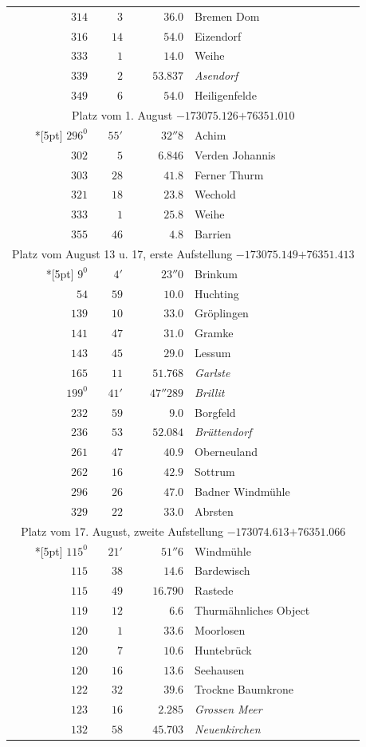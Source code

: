\begin{longtable}{@{}rrrp{.61\linewidth}@{}}
\(314\)&\(3\)&\(36.0\)&\raggedright Bremen Dom\tabularnewline
\(316\)&\(14\)&\(54.0\)&\raggedright Eizendorf\tabularnewline
\(333\)&\(1\)&\(14.0\)&\raggedright Weihe\tabularnewline
\(339\)&\(2\)&\(53.837\)&\raggedright \textit{Asendorf}\tabularnewline
\(349\)&\(6\)&\(54.0\)&\raggedright Heiligenfelde\tabularnewline
\multicolumn{4}{c}{Platz vom 1. August \(-173075.126\)\qquad\(+76351.010\)}\\*[5pt]
\(296^{0}\)&\(55'\)&\(32''8\)&\raggedright Achim\tabularnewline
\(302\)&\(5\)&\(6.846\)&\raggedright Verden Johannis\tabularnewline
\(303\)&\(28\)&\(41.8\)&\raggedright Ferner Thurm\tabularnewline
\(321\)&\(18\)&\(23.8\)&\raggedright Wechold\tabularnewline
\(333\)&\(1\)&\(25.8\)&\raggedright Weihe\tabularnewline
\(355\)&\(46\)&\(4.8\)&\raggedright Barrien\tabularnewline
\multicolumn{4}{c}{Platz vom August 13 u. 17, erste Aufstellung \(-173075.149\)\qquad\(+76351.413\)}\\*[5pt]
\(9^{0}\)&\(4'\)&\(23''0\)&\raggedright Brinkum\tabularnewline
\(54\)&\(59\)&\(10.0\)&\raggedright Huchting\tabularnewline
\(139\)&\(10\)&\(33.0\)&\raggedright Gröplingen\tabularnewline
\(141\)&\(47\)&\(31.0\)&\raggedright Gramke\tabularnewline
\(143\)&\(45\)&\(29.0\)&\raggedright Lessum\tabularnewline
\(165\)&\(11\)&\(51.768\)&\raggedright \textit{Garlste}\tabularnewline
\(199^{0}\)&\(41'\)&\(47''289\)&\raggedright \textit{Brillit}\tabularnewline
\(232\)&\(59\)&\(9.0\)&\raggedright Borgfeld\tabularnewline
\(236\)&\(53\)&\(52.084\)&\raggedright \textit{Brüttendorf}\tabularnewline
\(261\)&\(47\)&\(40.9\)&\raggedright Oberneuland\tabularnewline
\(262\)&\(16\)&\(42.9\)&\raggedright Sottrum\tabularnewline
\(296\)&\(26\)&\(47.0\)&\raggedright Badner Windmühle\tabularnewline
\(329\)&\(22\)&\(33.0\)&\raggedright Abrsten\tabularnewline
\multicolumn{4}{c}{Platz vom 17. August, zweite Aufstellung \(-173074.613\)\qquad\(+76351.066\)}\\*[5pt]
\(115^{0}\)&\(21'\)&\(51''6\)&\raggedright Windmühle\tabularnewline
\(115\)&\(38\)&\(14.6\)&\raggedright Bardewisch\tabularnewline
\(115\)&\(49\)&\(16.790\)&\raggedright Rastede\tabularnewline
\(119\)&\(12\)&\(6.6\)&\raggedright Thurmähnliches Object\tabularnewline
\(120\)&\(1\)&\(33.6\)&\raggedright Moorlosen\tabularnewline
\(120\)&\(7\)&\(10.6\)&\raggedright Huntebrück\tabularnewline
\(120\)&\(16\)&\(13.6\)&\raggedright Seehausen\tabularnewline
\(122\)&\(32\)&\(39.6\)&\raggedright Trockne Baumkrone\tabularnewline
\(123\)&\(16\)&\(2.285\)&\raggedright \textit{Grossen Meer}\tabularnewline
\(132\)&\(58\)&\(45.703\)&\raggedright \textit{Neuenkirchen}\tabularnewline

\end{longtable}

